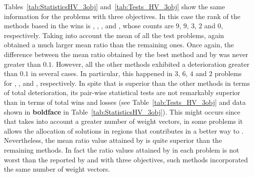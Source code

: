 Tables~\ref{tab:StatisticsHV_3obj} and~\ref{tab:Tests_HV_3obj} show the same information for the problems with three objectives.
%
In this case the rank of the methods based in the wins is \VSDMOEAD{}, \RMOEA{}, \MOEADDE{}, \NSGAIII{} and \NSGAII{}, whose counts are $9$, $9$, $3$, $2$ and $0$, respectively.
%
%
Taking into account the mean of all the test problems, \VSDMOEAD{} again obtained a much larger mean \HV{} ratio than the remaining ones.
%
Once again, the difference between the mean \HV{} ratio obtained by the best method and by \VSDMOEAD{} was never greater than $0.1$.
%
However, all the other methods exhibited a deterioration greater than $0.1$ in several cases.
%
In particular, this happened in $3$, $6$, $4$ and $2$ problems for \RMOEA{}, \NSGAII{}, \NSGAIII{} and \MOEADDE{}, respectively.
%
In spite that \VSDMOEAD{} is superior than the other methods in terms of total deterioration, its pair-wise statistical tests are not remarkably superior than \RMOEA{} in terms of total wins and losses (see Table~\ref{tab:Tests_HV_3obj} and data shown in {\bf boldface} in Table~\ref{tab:StatisticsHV_3obj}).
%
This might occurs since that \RMOEA{} takes into account a greater number of weight vectors, in some problems it allows the allocation of solutions in regions that contributes in a better way to \HV{}.
%
Nevertheless, the mean \HV{} ratio value attained by \VSDMOEAD{} is quite superior than the remaining methods.
%
In fact the \HV{} ratio values attained by \VSDMOEAD{} in each problem is not worst than the reported by \MOEADDE{} and \NSGAIII{} with three objectives, such methods incorporated the same number of weight vectors.
%
%










